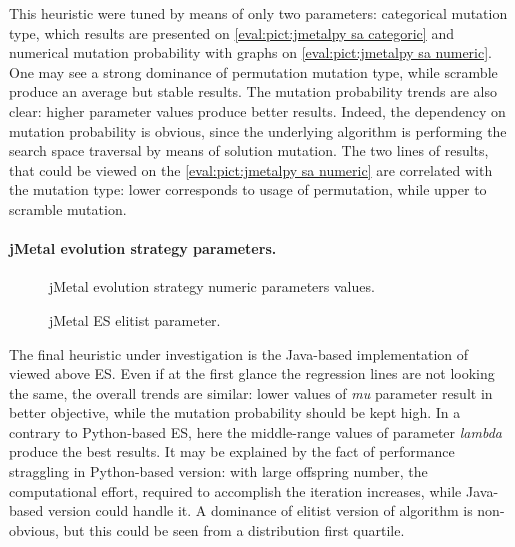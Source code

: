 This heuristic were tuned by means of only two parameters: categorical mutation type, which results are presented on \cref{eval:pict:jmetalpy sa categoric} and numerical mutation probability with graphs on \cref{eval:pict:jmetalpy sa numeric}. One may see a strong dominance of permutation mutation type, while scramble produce an average but stable results. The mutation probability trends are also clear: higher parameter values produce better results. Indeed, the dependency on mutation probability is obvious, since the underlying algorithm is performing the search space traversal by means of solution mutation. The two lines of results, that could be viewed on the \cref{eval:pict:jmetalpy sa numeric} are correlated with the mutation type: lower corresponds to usage of permutation, while upper to scramble mutation.


\paragraph{jMetal evolution strategy parameters.}
\begin{figure}[h]
	\centering
	\vspace{-10pt}
	
	\caption{jMetal evolution strategy numeric parameters values.}
	\vspace{-15pt}
	\label{eval:pict:jmetal es numeric}
\end{figure}

\begin{wrapfigure}{R}{0.5\textwidth}
	\centering
	\vspace{-20pt}
	
	\label{eval:pict:jmetal es categoric}
	\caption{jMetal ES elitist parameter.}
	\vspace{-30pt}
\end{wrapfigure}

The final heuristic under investigation is the Java-based implementation of viewed above ES. Even if at the first glance the regression lines are not looking the same, the overall trends are similar: lower values of \emph{mu} parameter result in better objective, while the mutation probability should be kept high. In a contrary to Python-based ES, here the middle-range values of parameter \emph{lambda} produce the best results. It may be explained by the fact of performance straggling in Python-based version: with large offspring number, the computational effort, required to accomplish the iteration increases, while Java-based version could handle it. A dominance of elitist version of algorithm is non-obvious, but this could be seen from a distribution first quartile.


